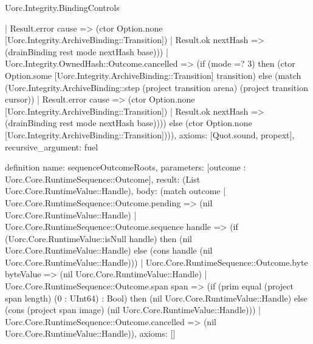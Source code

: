 \begin{lexlean}{Uorc.Integrity.BindingControls}
\begin{semanticmodule}
{        | Result.error cause => (ctor Option.none [Uorc.Integrity.ArchiveBinding::Transition])
        | Result.ok nextHash => (drainBinding rest mode nextHash base)))
      | Uorc.Integrity.OwnedHash::Outcome.cancelled => (if (mode =? 3) then (ctor Option.some [Uorc.Integrity.ArchiveBinding::Transition] transition) else (match (Uorc.Integrity.ArchiveBinding::step (project transition arena) (project transition cursor))
        | Result.error cause => (ctor Option.none [Uorc.Integrity.ArchiveBinding::Transition])
        | Result.ok nextHash => (drainBinding rest mode nextHash base)))) else (ctor Option.none [Uorc.Integrity.ArchiveBinding::Transition]))),
  axioms: [Quot.sound, propext],
  recursive_argument: fuel
}

definition{
  name: sequenceOutcomeRoots,
  parameters: [outcome : Uorc.Core.RuntimeSequence::Outcome],
  result: (List Uorc.Core.RuntimeValue::Handle),
  body: (match outcome
    | Uorc.Core.RuntimeSequence::Outcome.pending => (nil Uorc.Core.RuntimeValue::Handle)
    | Uorc.Core.RuntimeSequence::Outcome.sequence handle => (if (Uorc.Core.RuntimeValue::isNull handle) then (nil Uorc.Core.RuntimeValue::Handle) else (cons handle (nil Uorc.Core.RuntimeValue::Handle)))
    | Uorc.Core.RuntimeSequence::Outcome.byte byteValue => (nil Uorc.Core.RuntimeValue::Handle)
    | Uorc.Core.RuntimeSequence::Outcome.span span => (if (prim equal (project span length) (0 : UInt64) : Bool) then (nil Uorc.Core.RuntimeValue::Handle) else (cons (project span image) (nil Uorc.Core.RuntimeValue::Handle)))
    | Uorc.Core.RuntimeSequence::Outcome.cancelled => (nil Uorc.Core.RuntimeValue::Handle)),
  axioms: []
}


\end{semanticmodule}
\end{lexlean}
